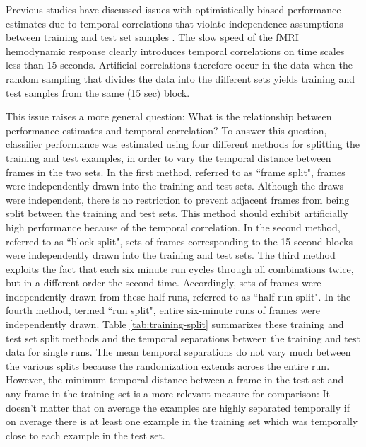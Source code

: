 \documentclass[preprint,5p,authoryear]{elsarticle}
\begin{document}
Previous studies have discussed issues with optimistically biased performance estimates due to temporal correlations that violate independence assumptions between training and test set samples \citep{Pereira2009}. 
The slow speed of the fMRI hemodynamic response clearly introduces temporal correlations on time scales less than 15 seconds.
Artificial correlations therefore occur in the data when the random sampling that divides the data into the different sets yields training and test samples from the same (15 sec) block.

This issue raises a more general question: What is the relationship between performance estimates and temporal correlation?
To answer this question, classifier performance was estimated using four different methods for splitting the training and test examples, in order to vary the temporal distance between frames in the two sets. 
In the first method, referred to as  ``frame split", frames were independently drawn into the training and test sets. 
Although the draws were independent, there is no restriction to prevent adjacent frames from being split between the training and test sets.
This method should exhibit artificially high performance because of the temporal correlation.
In the second method, referred to as ``block split", sets of frames corresponding to the 15 second blocks were independently drawn into the training and test sets.
The third method exploits the fact that each six minute run cycles through all combinations twice, but in a different order the second time.
Accordingly, sets of frames were independently drawn from these half-runs, referred to as ``half-run split". 
In the fourth method, termed ``run split", entire six-minute runs of frames were independently drawn. 
Table \ref{tab:training-split} summarizes these training and test set split methods and the temporal separations between the training and test data for single runs. 
The mean temporal separations do not vary much between the various splits because the randomization extends across the entire run. 
However, the minimum temporal distance between a frame in the test set and any frame in the training set is a more relevant measure for comparison: It doesn't matter that on average the examples are highly separated temporally if on average there is at least one example in the training set which was temporally close to each example in the test set.
\end{document}
